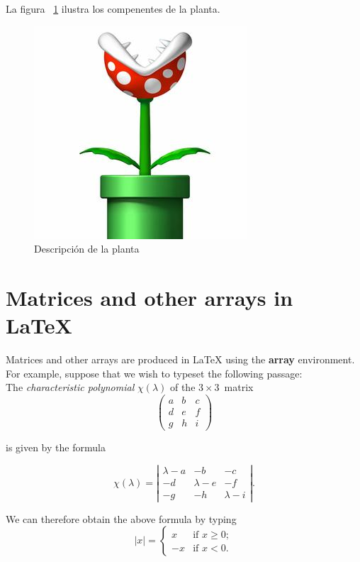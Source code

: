         La figura ~\ref{fig:planta}    %
        ilustra los compenentes de la planta.

        \begin{figure}
          \centering
            \includegraphics[scale=0.5]{Apendice1/figs/planta.jpg}      %
            \caption{Descripción de la planta}            %
            \label{fig:planta}                            %
        \end{figure}
        
        \section{Matrices and other arrays in \LaTeX}
            Matrices and other arrays are produced in LaTeX using the \textbf{array} environment. For example, suppose that we wish to typeset the following passage:\\
            The \emph{characteristic polynomial} $\chi(\lambda)$ of the $3 \times 3
            $~matrix
            \[ \left( 
                \begin{array}{ccc}
                    a & b & c \\
                    d & e & f \\
                    g & h & i \end{array} \right)\]


        is given by the formula


            \[ \chi(\lambda) = \left| \begin{array}{ccc}
            \lambda - a & -b & -c \\
            -d & \lambda - e & -f \\
            -g & -h & \lambda - i \end{array} \right|.\] 
            
            
        We can therefore obtain the above formula by typing
        \[ |x| = \left\{ \begin{array}{ll}
                 x & \mbox{if $x \geq 0$};\\
                -x & \mbox{if $x < 0$}.\end{array} \right. \]
